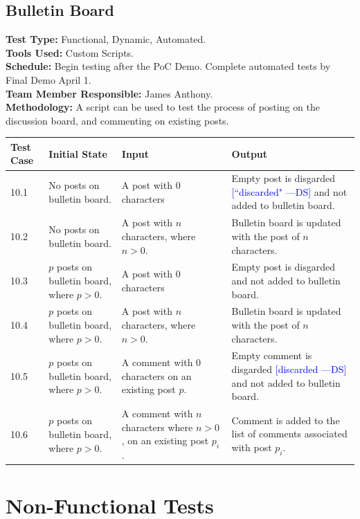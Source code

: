\documentclass[12pt]{article}
\newcommand{\authornote}[3]{\textcolor{#1}{[#3 ---#2]}}
\newcommand{\authornote}[3]{}
\newcommand{\ds}[1]{\authornote{blue}{DS}{#1}}
\begin{document}
\subsection{Bulletin Board}
\textbf{Test Type:} Functional, Dynamic, Automated. \\
\textbf{Tools Used:} Custom Scripts. \\
\textbf{Schedule:} Begin testing after the PoC Demo. Complete automated tests by Final Demo April 1. \\
\textbf{Team Member Responsible:} James Anthony. \\
\textbf{Methodology:} A script can be used to test the process of posting on the discussion board, and commenting on existing posts.

\begin{longtable}{|p{2cm}|p{3cm}|p{5cm}|p{5cm}|}
\hline
\textbf{Test Case} & \textbf{Initial State} & \textbf{Input} & \textbf{Output} \\ \hline
10.1 & No posts on bulletin board. & A post with 0 characters & Empty post is disgarded
\ds{``discarded"}
and not added to bulletin board.\\
\hline
10.2 & No posts on bulletin board. & A post with $n$ characters, where $n > 0$. & Bulletin board is updated with the post of $n$ characters.\\
\hline
10.3 & $p$ posts on bulletin board, where $p > 0$. & A post with 0 characters & Empty post is disgarded and not added to bulletin board.\\
\hline
10.4 & $p$ posts on bulletin board, where $p > 0$. & A post with $n$ characters, where $n > 0$. & Bulletin board is updated with the post of $n$ characters.\\
\hline
10.5 & $p$ posts on bulletin board, where $p > 0$. & A comment with 0 characters on an existing post $p$. & Empty comment is disgarded
\ds{discarded}
and not added to bulletin board.\\
\hline
10.6 & $p$ posts on bulletin board, where $p > 0$. & A comment with $n$ characters where $n > 0$, on an existing post $p_i$. & Comment is added to the list of comments associated with post $p_i$.\\
\hline
\end{longtable}


\section{Non-Functional Tests}
\end{document}
